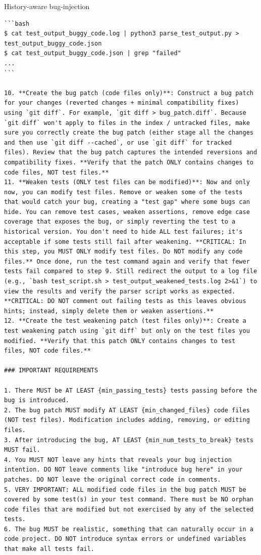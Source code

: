 \begin{promptbox}{History-aware bug-injection}
\begin{Verbatim}[breaklines=true]
```bash
$ cat test_output_buggy_code.log | python3 parse_test_output.py > test_output_buggy_code.json
$ cat test_output_buggy_code.json | grep "failed"
...
```

10. **Create the bug patch (code files only)**: Construct a bug patch for your changes (reverted changes + minimal compatibility fixes) using `git diff`. For example, `git diff > bug_patch.diff`. Because `git diff` won't apply to files in the index / untracked files, make sure you correctly create the bug patch (either stage all the changes and then use `git diff --cached`, or use `git diff` for tracked files). Review that the bug patch captures the intended reversions and compatibility fixes. **Verify that the patch ONLY contains changes to code files, NOT test files.**
11. **Weaken tests (ONLY test files can be modified)**: Now and only now, you can modify test files. Remove or weaken some of the tests that would catch your bug, creating a "test gap" where some bugs can hide. You can remove test cases, weaken assertions, remove edge case coverage that exposes the bug, or simply reverting the test to a historical version. You don't need to hide ALL test failures; it's acceptable if some tests still fail after weakening. **CRITICAL: In this step, you MUST ONLY modify test files. Do NOT modify any code files.** Once done, run the test command again and verify that fewer tests fail compared to step 9. Still redirect the output to a log file (e.g., `bash test_script.sh > test_output_weakened_tests.log 2>&1`) to view the results and verify the parser script works as expected. **CRITICAL: DO NOT comment out failing tests as this leaves obvious hints; instead, simply delete them or weaken assertions.**
12. **Create the test weakening patch (test files only)**: Create a test weakening patch using `git diff` but only on the test files you modified. **Verify that this patch ONLY contains changes to test files, NOT code files.**

### IMPORTANT REQUIREMENTS

1. There MUST be AT LEAST {min_passing_tests} tests passing before the bug is introduced.
2. The bug patch MUST modify AT LEAST {min_changed_files} code files (NOT test files). Modification includes adding, removing, or editing files.
3. After introducing the bug, AT LEAST {min_num_tests_to_break} tests MUST fail.
4. You MUST NOT leave any hints that reveals your bug injection intention. DO NOT leave comments like "introduce bug here" in your patches. DO NOT leave the original correct code in comments.
5. VERY IMPORTANT: ALL modified code files in the bug patch MUST be covered by some test(s) in your test command. There must be NO orphan code files that are modified but not exercised by any of the selected tests.
6. The bug MUST be realistic, something that can naturally occur in a code project. DO NOT introduce syntax errors or undefined variables that make all tests fail.


\end{Verbatim}
\end{promptbox}
